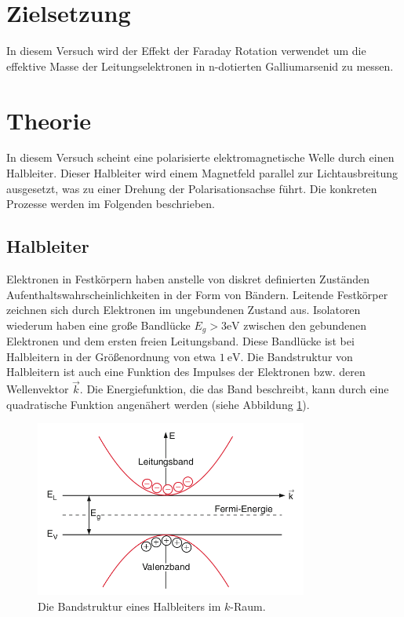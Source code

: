 \section{Zielsetzung}
In diesem Versuch wird der Effekt der Faraday Rotation verwendet um die
effektive Masse der Leitungselektronen in n-dotierten Galliumarsenid zu messen.

\section{Theorie}
In diesem Versuch scheint eine polarisierte elektromagnetische Welle durch
einen Halbleiter. Dieser Halbleiter wird einem Magnetfeld parallel zur
Lichtausbreitung ausgesetzt, was zu einer Drehung der Polarisationsachse führt.
Die konkreten Prozesse werden im Folgenden beschrieben.

\subsection{Halbleiter \cite[][Kap. 14]{book:expi3}}

Elektronen in Festkörpern haben anstelle von diskret definierten Zuständen
Aufenthaltswahrscheinlichkeiten in der Form von Bändern. Leitende Festkörper
zeichnen sich durch Elektronen im ungebundenen Zustand aus. Isolatoren wiederum
haben eine große Bandlücke $E_g > 3 \unit{\eV}$ \cite{web:Bandlücke} zwischen
den gebundenen Elektronen und dem ersten freien Leitungsband. Diese Bandlücke
ist bei Halbleitern in der Größenordnung von etwa
$\qty{1}{\eV}$\cite{web:Bandlücke}. Die Bandstruktur von Halbleitern ist auch
eine Funktion des Impulses der Elektronen bzw. deren Wellenvektor $\vec{k}$.
Die Energiefunktion, die das Band beschreibt, kann durch eine quadratische
Funktion angenähert werden (siehe Abbildung \ref{fig:band}).

\begin{figure}
	\centering
	\includegraphics[width=0.8\textwidth]{./Bilder/bandstrukt.png}
	\caption{Die Bandstruktur eines Halbleiters im $k$-Raum\cite{book:expi3}.}\label{fig:band}
\end{figure}

